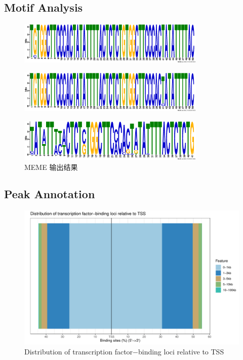 \documentclass[UTF8]{ctexart}
\begin{document}
\subsection{Motif Analysis}

\begin{figure}
	\centering
	\includegraphics[width=0.8\textwidth]{img/meme_out/logo1.eps}
\end{figure}

\begin{figure}
	\centering
	\includegraphics[width=0.8\textwidth]{img/meme_out/logo2.eps}
\end{figure}

\begin{figure}
	\centering
	\includegraphics[width=0.8\textwidth]{img/meme_out/logo3.eps}
	\caption{MEME 输出结果}
\end{figure}

\subsection{Peak Annotation}

\begin{figure}[htb]
	\centering
	\includegraphics[width=\textwidth]{img/peak_distrubution.pdf}
    \caption{Distribution of transcription factor−binding loci relative to TSS}
\end{figure}
\end{document}
